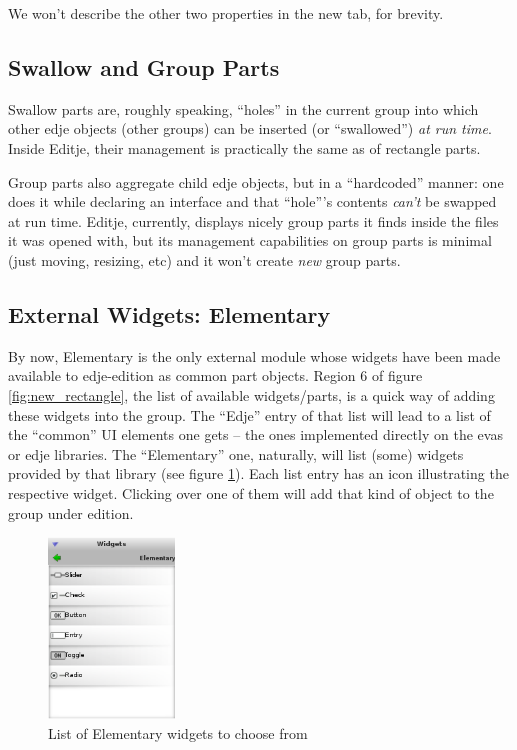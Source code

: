\documentclass[a4paper]{profusion}
\begin{document}

We won't describe the other two properties in the new tab, for
brevity.

\subsection{Swallow and Group Parts}

Swallow parts are, roughly speaking, ``holes'' in the current group
into which other edje objects (other groups) can be inserted (or
``swallowed'') \emph{at run time}. Inside Editje, their management is
practically the same as of rectangle parts.

Group parts also aggregate child edje objects, but in a ``hardcoded''
manner: one does it while declaring an interface and that ``hole'''s
contents \emph{can't} be swapped at run time. Editje, currently,
displays nicely group parts it finds inside the files it was opened
with, but its management capabilities on group parts is minimal (just
moving, resizing, etc) and it won't create \emph{new} group parts.

\subsection{External Widgets: Elementary}

By now, Elementary is the only external module whose widgets have been
made available to edje-edition as common part objects. Region 6 of
figure \ref{fig:new_rectangle}, the list of available widgets/parts,
is a quick way of adding these widgets into the group. The ``Edje''
entry of that list will lead to a list of the ``common'' UI elements
one gets -- the ones implemented directly on the evas or edje
libraries. The ``Elementary'' one, naturally, will list (some) widgets
provided by that library (see figure \ref{fig:elm_widgets}). Each list
entry has an icon illustrating the respective widget. Clicking over
one of them will add that kind of object to the group under edition.

\begin{figure}[h!]
  \centering
  \includegraphics[width=0.3\textwidth]{images/elm_widgets.png}
  \caption{List of Elementary widgets to choose from}
  \label{fig:elm_widgets}
\end{figure}
\end{document}
